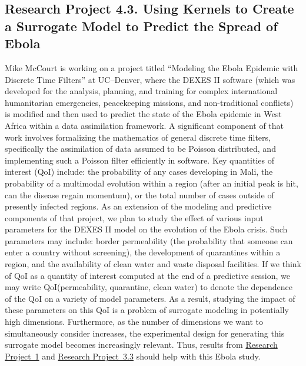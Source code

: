 \documentclass[11pt]{NSFamsart}
\newcommand{\refproba}{\hyperref[SectHSSVD]{Research Project~1}\xspace}
\newcommand{\refprobcc}{\hyperref[designsubsec]{Research Project~3.3}\xspace}
\begin{document}
\subsection*{Research Project 4.3. Using Kernels to Create a Surrogate Model to Predict the Spread of Ebola} \label{ebolasubsec}
Mike McCourt is working on a project titled ``Modeling the Ebola Epidemic with Discrete Time Filters'' at UC--Denver, where the DEXES II software (which was developed for the analysis, planning, and training for complex international humanitarian emergencies, peacekeeping missions, and non-traditional conflicts) is modified and then used to predict the state of the Ebola epidemic in West Africa within a data assimilation framework. A significant component of that work involves formalizing the mathematics of general discrete time filters, specifically the assimilation of data assumed to be Poisson distributed, and implementing such a Poisson filter efficiently in software. Key quantities of interest (QoI) include: the probability of any cases developing in Mali, the probability of a multimodal evolution within a region (after an initial peak is hit, can the disease regain momentum), or the total number of cases outside of presently infected regions.
As an extension of the modeling and predictive components of that project, we plan to study the effect of various input parameters for the DEXES II model on the evolution of the Ebola crisis.  Such parameters may include: border permeability (the probability that someone can enter a country without screening), the development of quarantines within a region, and the availability of clean water and waste disposal facilities.  If we think of QoI as a quantity of interest computed at the end of a predictive session, we may write QoI(permeability, quarantine, clean water) to denote the dependence of the QoI on a variety of model parameters.  As a result, studying the impact of these parameters on this QoI is a problem of surrogate modeling in potentially high dimensions.  Furthermore, as the number of dimensions we want to simultaneously consider increases, the experimental design for generating this surrogate model becomes increasingly relevant.  Thus, results from \refproba and \refprobcc should help with this Ebola study.
\end{document}
